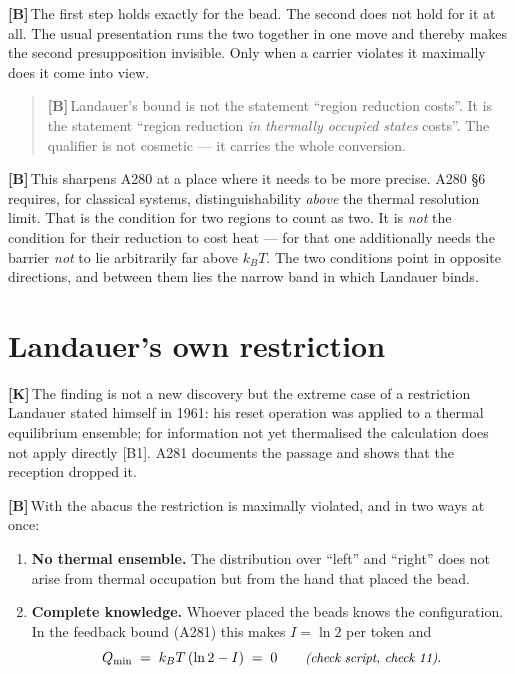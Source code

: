 \documentclass[11pt,a4paper]{article}
\newcommand{\LK}{\textcolor{layK}{\textbf{\footnotesize\textsf{[K]}}}\,}
\newcommand{\LB}{\textcolor{layB}{\textbf{\footnotesize\textsf{[B]}}}\,}
\newcommand{\pruef}[1]{{\small\itshape(check script, #1)}}
\begin{document}
\LB The first step holds exactly for the bead. The second does not hold for it at
all. The usual presentation runs the two together in one move and thereby makes
the second presupposition invisible. Only when a carrier violates it maximally
does it come into view.

\begin{quote}
\LB Landauer's bound is not the statement “region reduction costs”. It is the
statement “region reduction \emph{in thermally occupied states} costs”. The
qualifier is not cosmetic --- it carries the whole conversion.
\end{quote}

\LB This sharpens A280 at a place where it needs to be more precise. A280 §6
requires, for classical systems, distinguishability \emph{above} the thermal
resolution limit. That is the condition for two regions to count as two. It is
\emph{not} the condition for their reduction to cost heat --- for that one
additionally needs the barrier \emph{not} to lie arbitrarily far above $k_BT$.
The two conditions point in opposite directions, and between them lies the narrow
band in which Landauer binds.

\section{Landauer's own restriction}

\LK The finding is not a new discovery but the extreme case of a restriction
Landauer stated himself in 1961: his reset operation was applied to a thermal
equilibrium ensemble; for information not yet thermalised the calculation does not
apply directly [B1]. A281 documents the passage and shows that the reception
dropped it.

\LB With the abacus the restriction is maximally violated, and in two ways at
once:

\begin{enumerate}[leftmargin=1.6em,itemsep=0.3em]
  \item \textbf{No thermal ensemble.} The distribution over “left” and “right”
        does not arise from thermal occupation but from the hand that placed the
        bead.
  \item \textbf{Complete knowledge.} Whoever placed the beads knows the
        configuration. In the feedback bound (A281) this makes $I = \ln 2$ per
        token and
        \begin{equation}
          Q_{\min} \;=\; k_B T\,(\ln 2 - I) \;=\; 0
          \qquad \text{\pruef{check 11}} .
        \end{equation}
\end{enumerate}
\end{document}
